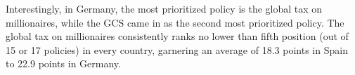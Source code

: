 \documentclass{nature}
\makeatletter
\renewenvironment*{figure}{\@float{figure}}{\end@float}
\makeatother
\begin{document}
Interestingly, in Germany, the most prioritized policy is the global tax on millionaires, while the GCS came in as the second most prioritized policy. The global tax on millionaires consistently ranks no lower than fifth position (out of 15 or 17 policies) in every country, garnering an average of 18.3 points in Spain to 22.9 points in Germany.


  

\end{document}
